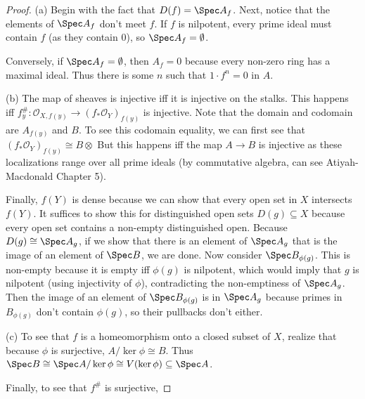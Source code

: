 \begin{proof}
	(a) Begin with the fact that $D(f) = \Spec A_f $.
	Next, notice that the elements of $\Spec A_f $ don't meet $f $.
	If $f $ is nilpotent, every prime ideal must contain $f $ (as they contain $0 $), so $\Spec A_f = \emptyset $.

	Conversely, if $\Spec A_f = \emptyset $, then $A_f = 0$ because every non-zero ring has a maximal ideal.
	Thus there is some $n $ such that $1\cdot f^n = 0 $ in $A $.

	(b) The map of sheaves is injective iff it is injective on the stalks.
	This happens iff $f^\#_{y}: \mathscr{O}_{X,f(y)} \to (f_\ast \mathscr{O}_{Y})_{f(y)}$ is injective.
	Note that the domain and codomain are $A_{f(y)} $ and $B$.
	To see this codomain equality, we can first see that $(f_\ast \mathscr{O}_Y)_{f(y)} \cong B \otimes $
	But this happens iff the map $A\to B $ is injective as these localizations range over all prime ideals (by commutative algebra, can see Atiyah-Macdonald Chapter 5).

	Finally, $f(Y) $ is dense because we can show that every open set in $X $ intersects $f(Y) $.
	It suffices to show this for distinguished open sets $D(g) \subseteq X $ because every open set contains a non-empty distinguished open.
	Because $D(g) \cong \Spec A_g $, if we show that there is an element of $\Spec A_g $ that is the image of an element of $\Spec B $, we are done.
	Now consider $\Spec B_{\phi (g)} $.
	This is non-empty because it is empty iff $\phi (g) $ is nilpotent, which would imply that $g $ is nilpotent (using injectivity of $\phi  $), contradicting the non-emptiness of $\Spec A_g $.
	Then the image of an element of $\Spec B_{\phi (g)} $ is in $\Spec A_g $ because primes in $B_{\phi (g)} $ don't contain $\phi (g) $, so their pullbacks don't either.

	(c) 
	To see that $f $ is a homeomorphism onto a closed subset of $X $, realize that because $\phi  $ is surjective, $A / \ker \phi \cong B $.
	Thus $\Spec B \cong \Spec A / \ker \phi \cong V(\ker \phi) \subseteq \Spec A$.

	Finally, to see that $f^\# $ is surjective, 
\end{proof}

